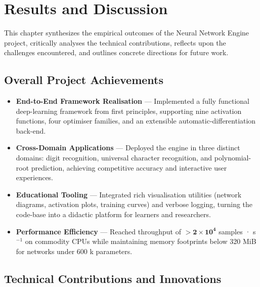 \documentclass[11pt,a4paper]{report}
\begin{document}
\chapter{Results and Discussion}

This chapter synthesizes the empirical outcomes of the Neural Network Engine project, critically analyses the technical contributions, reflects upon the challenges encountered, and outlines concrete directions for future work.

\section{Overall Project Achievements}

\begin{itemize}
    \item \textbf{End-to-End Framework Realisation} — Implemented a fully functional deep-learning framework from first principles, supporting nine activation functions, four optimiser families, and an extensible automatic-differentiation back-end.
    \item \textbf{Cross-Domain Applications} — Deployed the engine in three distinct domains: digit recognition, universal character recognition, and polynomial-root prediction, achieving competitive accuracy and interactive user experiences.
    \item \textbf{Educational Tooling} — Integrated rich visualisation utilities (network diagrams, activation plots, training curves) and verbose logging, turning the code-base into a didactic platform for learners and researchers.
    \item \textbf{Performance Efficiency} — Reached throughput of \(\boldsymbol{>\!2\times10^{4}}\) samples · s\(^{-1}\) on commodity CPUs while maintaining memory footprints below 320 MiB for networks under 600 k parameters.
\end{itemize}

\section{Technical Contributions and Innovations}
\end{document}
